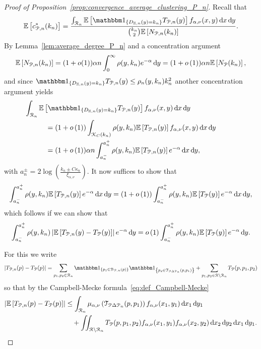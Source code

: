 \begin{proof}[Proof of Proposition~\ref{prop:convergence_average_clustering_P_n}]

Recall that
\[
	\Exp{c_{\Pcal,n}^\ast(k_n)} = \frac{\int_{\Rcal_n} \Exp{\ind{D_{\H,n}(y) = k_n} T_{\Pcal,n}(y)} f_{\alpha,\nu}(x,y) \dd x \dd y}{\binom{k_n}{2}\Exp{N_{\Pcal,n}(k_n)}}.
\]
By Lemma~\ref{lem:average_degree_P_n} and a concentration argument
\[
	\mathbb{E}\left[N_{{\mathcal P},n}(k_n)\right] = (1+o(1)) \alpha n \int_{0}^\infty \rho(y,k_n) e^{-\alpha} \operatorname{\mathrm{d}\hspace{-2pt}} y 
	= (1+o\left(1\right)) \alpha n \mathbb{E}\left[N_{{\mathcal P}}(k_n)\right],
\]
and since $\ind{D_{\H,n}(y) = k_n} T_{\Pcal,n}(y) \le \rho_n(y,k_n) k_n^2$ another concentration argument yields
\begin{align*}
	&\hspace{-30pt}\int_{\Rcal_n} \Exp{\ind{D_{\H,n}(y) = k_n} T_{\Pcal,n}(y)} 
		f_{\alpha,\nu}(x,y) \dd x \dd y\\
	&= (1+\smallO{1})\int_{\Kcal_C(k_n)} \rho(y,k_n) \Exp{T_{\Pcal,n}(y)} f_{\alpha,\nu}(x,y) \dd x \dd y\\
	&= (1 + \smallO{1}) \alpha n \int_{a_n^-}^{a_n^+} \rho(y,k_n) \Exp{T_{\Pcal,n}(y)} e^{-\alpha} \dd x \dd y,
\end{align*}
with $a_n^\pm = 2\log\left(\frac{k_n \pm C \kappa_n}{\xi_{\alpha,\nu}}\right)$. It now suffices to show that
\[
	\int_{a_n^-}^{a_n^+} \rho(y,k_n) \mathbb{E}\left[T_{{\mathcal P},n}(y)\right] e^{-\alpha} \operatorname{\mathrm{d}\hspace{-2pt}} x \operatorname{\mathrm{d}\hspace{-2pt}} y
	= (1+o\left(1\right)) \int_{a_n^-}^{a_n^+} \rho(y,k_n) \mathbb{E}\left[T_{{\mathcal P}}(y)\right] e^{-\alpha} \operatorname{\mathrm{d}\hspace{-2pt}} x \operatorname{\mathrm{d}\hspace{-2pt}} y, 
\]
which follows if we can show that
\[
	\int_{a_n^-}^{a_n^+} \rho(y,k_n) \left|\mathbb{E}\left[T_{{\mathcal P},n}(y) - T_{{\mathcal P}}(y)\right]\right| e^{-\alpha} \operatorname{\mathrm{d}\hspace{-2pt}} y
	= o\left(1\right) \int_{a_n^-}^{a_n^+} \rho(y,k_n) \mathbb{E}\left[T_{{\mathcal P}}(y)\right] e^{-\alpha} \operatorname{\mathrm{d}\hspace{-2pt}} y.
\]

For this we write
\begin{align*}
	\left|T_{\Pcal,n}(p) - T_{\Pcal}(p)\right| = \sum_{p_1, p_2 \in \Rcal_n} \ind{p_1 \in \BallPon{p}} \ind{p_2 \in \mathcal{T}_{\Pcal \Delta \Pcal_n}(p, p_1)} + \sum_{p_1, p_2 \in \Rcal \setminus \Rcal_n} T_{\Pcal}(p,p_1,p_2)
\end{align*}
so that by the Campbell-Mecke formula~\eqref{eq:def_Campbell-Mecke}
\begin{align*}
	\left|\mathbb{E}\left[T_{{\mathcal P},n}(p) - T_{{\mathcal P}}(p)\right]\right|
	&\le \int_{{\mathcal R}_n} \mu_{\alpha, \nu}\left(\mathcal{T}_{{\mathcal P} \Delta {\mathcal P}_n}(p,p_1)\right) f_{\alpha, \nu}(x_1,y_1) 
		\operatorname{\mathrm{d}\hspace{-2pt}} x_1 \operatorname{\mathrm{d}\hspace{-2pt}} y_1\\
	&\hspace{10pt}+ \iint_{{\mathcal R} \setminus {\mathcal R}_n} T_{{\mathcal P}}(p,p_1,p_2) f_{\alpha, \nu}(x_1,y_1) f_{\alpha, \nu}(x_2,y_2)
		\operatorname{\mathrm{d}\hspace{-2pt}} x_2 \operatorname{\mathrm{d}\hspace{-2pt}} y_2 \operatorname{\mathrm{d}\hspace{-2pt}} x_1 \operatorname{\mathrm{d}\hspace{-2pt}} y_1. 
\end{align*}


\end{proof}
